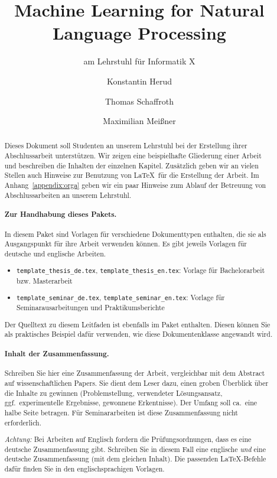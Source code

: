 \documentclass[bachelor,german]{info1thesis}
\title{Machine Learning for Natural Language Processing} %
\subtitle{am Lehrstuhl für Informatik X}
\author{Konstantin Herud\and Thomas Schaffroth\and Maximilian Meißner} %
\begin{document}

\begin{abstract}
    Dieses Dokument soll Studenten an unserem Lehrstuhl bei der Erstellung
    ihrer Abschlussarbeit unterstützen.
    Wir zeigen eine beispielhafte Gliederung einer Arbeit und beschreiben
    die Inhalten der einzelnen Kapitel.
    Zusätzlich geben wir an vielen Stellen auch Hinweise zur Benutzung von
    \LaTeX\ für die Erstellung der Arbeit.
    Im Anhang~\ref{appendix:orga} geben wir ein paar Hinweise zum Ablauf der
    Betreuung von Abschlussarbeiten an unserem Lehrstuhl.

    \paragraph{Zur Handhabung dieses Pakets.}
    In diesem Paket sind Vorlagen für verschiedene Dokumenttypen enthalten, die
    sie als Ausgangspunkt für ihre Arbeit verwenden können.
    Es gibt jeweils Vorlagen für deutsche und englische Arbeiten.
    \begin{itemize}
        \item \verb+template_thesis_de.tex+, \verb+template_thesis_en.tex+:
            Vorlage für Bachelorarbeit bzw. Masterarbeit
        \item \verb+template_seminar_de.tex+, \verb+template_seminar_en.tex+:
            Vorlage für Seminarausarbeitungen und Praktikumsberichte
    \end{itemize}
    Der Quelltext zu diesem Leitfaden ist ebenfalls im Paket enthalten.
    Diesen können Sie als praktisches Beispiel dafür verwenden, wie diese
    Dokumentenklasse angewandt wird.

    \paragraph{Inhalt der Zusammenfassung.}
    Schreiben Sie hier eine Zusammenfassung der Arbeit, vergleichbar mit dem Abstract auf wissenschaftlichen Papers.
    Sie dient dem Leser dazu, einen groben Überblick über die Inhalte zu gewinnen (Problemstellung, verwendeter Lösungsansatz, ggf.\ experimentelle Ergebnisse, gewonnene Erkentnisse).
    Der Umfang soll ca.\ eine halbe Seite betragen.
    Für Seminararbeiten ist diese Zusammenfassung nicht erforderlich.
    
    \emph{Achtung:} Bei Arbeiten auf Englisch fordern die
    Prüfungsordnungen, dass es eine deutsche Zusammenfassung gibt.
    Schreiben Sie in diesem Fall eine englische \emph{und} eine deutsche Zusammenfassung (mit dem gleichen Inhalt).
    Die passenden \LaTeX-Befehle dafür finden Sie in den englischsprachigen
    Vorlagen.


\end{abstract}
\end{document}
